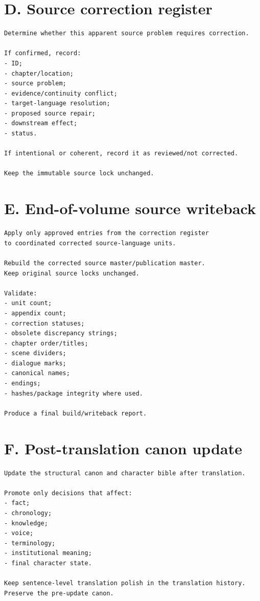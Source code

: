 \documentclass[11pt,oneside,openany]{book}
\begin{document}
\section{D. Source correction register}\label{d.-source-correction-register}

\begin{lstlisting}
Determine whether this apparent source problem requires correction.

If confirmed, record:
- ID;
- chapter/location;
- source problem;
- evidence/continuity conflict;
- target-language resolution;
- proposed source repair;
- downstream effect;
- status.

If intentional or coherent, record it as reviewed/not corrected.

Keep the immutable source lock unchanged.
\end{lstlisting}

\section{E. End-of-volume source writeback}\label{e.-end-of-volume-source-writeback}

\begin{lstlisting}
Apply only approved entries from the correction register
to coordinated corrected source-language units.

Rebuild the corrected source master/publication master.
Keep original source locks unchanged.

Validate:
- unit count;
- appendix count;
- correction statuses;
- obsolete discrepancy strings;
- chapter order/titles;
- scene dividers;
- dialogue marks;
- canonical names;
- endings;
- hashes/package integrity where used.

Produce a final build/writeback report.
\end{lstlisting}

\section{F. Post-translation canon update}\label{f.-post-translation-canon-update}

\begin{lstlisting}
Update the structural canon and character bible after translation.

Promote only decisions that affect:
- fact;
- chronology;
- knowledge;
- voice;
- terminology;
- institutional meaning;
- final character state.

Keep sentence-level translation polish in the translation history.
Preserve the pre-update canon.
\end{lstlisting}
\end{document}
